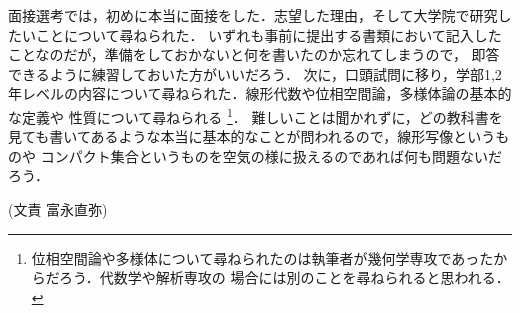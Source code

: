 \documentclass[uplatex]{jsarticle}
\begin{document}
面接選考では，初めに本当に面接をした．志望した理由，そして大学院で研究したいことについて尋ねられた．
いずれも事前に提出する書類において記入したことなのだが，準備をしておかないと何を書いたのか忘れてしまうので，
即答できるように練習しておいた方がいいだろう．
次に，口頭試問に移り，学部1,2年レベルの内容について尋ねられた．線形代数や位相空間論，多様体論の基本的な定義や
性質について尋ねられる
\footnote{位相空間論や多様体について尋ねられたのは執筆者が幾何学専攻であったからだろう．代数学や解析専攻の
場合には別のことを尋ねられると思われる．}．
難しいことは聞かれずに，どの教科書を見ても書いてあるような本当に基本的なことが問われるので，線形写像というものや
コンパクト集合というものを空気の様に扱えるのであれば何も問題ないだろう．
\begin{flushright}
	(文責 富永直弥)
\end{flushright}
\end{document}

